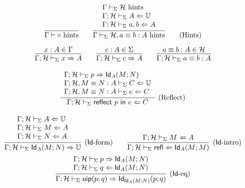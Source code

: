 \documentclass{amsart}
\begin{document}
\begin{equation}
  \infer{\Gamma\vdash \emp\hints}{}
  \qquad
  \infer{
    \Gamma\vdash_\Sigma \mathcal{H}, a\equiv b:A\hints
  }{
    \begin{array}{l}
      \Gamma\vdash_\Sigma \mathcal{H}\hints\\
      \Gamma;\mathcal{H}\vdash_\Sigma A\checks\uni\\
      \Gamma;\mathcal{H}\vdash_\Sigma a,b\checks A
    \end{array}
  }
  \tag{Hints}
\end{equation}

\begin{gather*}
  \infer{
    \Gamma;\mathcal{H}\vdash_\Sigma x\infers A
  }{
    x:A\in\Gamma
  }
  \qquad
  \infer{
    \Gamma;\mathcal{H}\vdash_\Sigma c\infers A
  }{
    c:A\in\Sigma
  }
  \qquad
  \infer{
    \Gamma;\mathcal{H}\vdash_\Sigma a\equiv b:A
  }{
    a\equiv b:A \in \mathcal{H}
  }
\end{gather*}

\begin{gather*}
  \infer[\text{(Reflect)}]{
    \Gamma;\mathcal{H}\vdash_\Sigma \mathsf{reflect}\ p\ \mathsf{in}\ e \checks C
  }{
    \begin{array}{l}
      \Gamma;\mathcal{H}\vdash_\Sigma p \infers \mathsf{Id}_A(M;N)\\
      \Gamma;\mathcal{H}, M\equiv N:A\vdash_\Sigma C\checks\uni\\
      \Gamma;\mathcal{H}, M\equiv N:A\vdash_\Sigma e \checks C
    \end{array}
  }
\end{gather*}

\begin{gather*}
  \infer[(\text{$\mathsf{Id}$-form})]{
    \Gamma;\mathcal{H}\vdash_\Sigma \mathsf{Id}_A(M;N)\infers\uni
  }{
    \begin{array}{l}
      \Gamma;\mathcal{H}\vdash_\Sigma A\checks\uni\\
      \Gamma;\mathcal{H}\vdash_\Sigma M\checks A\\
      \Gamma;\mathcal{H}\vdash_\Sigma N\checks A
    \end{array}
  }
  \qquad
  \infer[(\text{$\mathsf{Id}$-intro})]{
    \Gamma;\mathcal{H}\vdash_\Sigma \mathsf{refl}\checks \mathsf{Id}_A(M;M)
  }{
    \Gamma;\mathcal{H}\vdash_\Sigma M\checks A
  }\\
  \infer[(\text{$\mathsf{Id}$-eq})]{
    \Gamma;\mathcal{H}\vdash_\Sigma \mathsf{uip}(p; q)\infers\mathsf{Id}_{\mathsf{Id}_A(M;N)}(p;q)
  }{
    \begin{array}{l}
      \Gamma;\mathcal{H}\vdash_\Sigma p\infers \mathsf{Id}_A(M;N)\\
      \Gamma;\mathcal{H}\vdash_\Sigma q\checks \mathsf{Id}_A(M;N)
    \end{array}
  }
\end{gather*}
\end{document}
